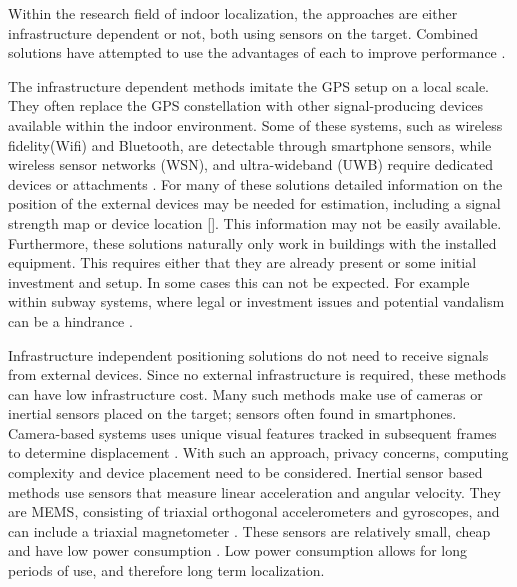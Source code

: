 Within the research field of indoor localization, the approaches are either infrastructure dependent or not, both using sensors on the target. Combined solutions have attempted to use the advantages of each to improve performance \cite{Gu2019, Correa2017}.\par

The infrastructure dependent methods imitate the GPS setup on a local scale. They often replace the GPS constellation with other signal-producing devices available within the indoor environment. Some of these systems, such as wireless fidelity(Wifi) and Bluetooth, are detectable through smartphone sensors, while wireless sensor networks (WSN), and ultra-wideband (UWB) require dedicated devices or attachments \cite{Wu2019,Jackermeier2018,Davidson2017}. For many of these solutions detailed information on the position of the external devices may be needed for estimation, including a signal strength map or device location [\qn]. This information may not be easily available. Furthermore, these solutions naturally only work in buildings with the installed equipment. This requires either that they are already present or some initial investment and setup. In some cases this can not be expected. For example within subway systems, where legal or investment issues and potential vandalism can be a hindrance \cite{Torok2014}. \par
%

Infrastructure independent positioning solutions do not need to receive signals from external devices. Since no external infrastructure is required, these methods can have low infrastructure cost. Many such methods make use of cameras or inertial sensors placed on the target; sensors often found in smartphones. Camera-based systems uses unique visual features tracked in subsequent frames to determine displacement \cite{Gu2019}. With such an approach, privacy concerns, computing complexity and device placement need to be considered. Inertial sensor based methods use sensors that measure linear acceleration and angular velocity. They are \ac{MEMS},  consisting of triaxial orthogonal accelerometers and gyroscopes, and can include a triaxial magnetometer \cite{Yang2014}. These sensors are relatively small, cheap and have low power consumption \cite{Olsson2016}. Low power consumption allows for long periods of use, and therefore long term localization. \par

